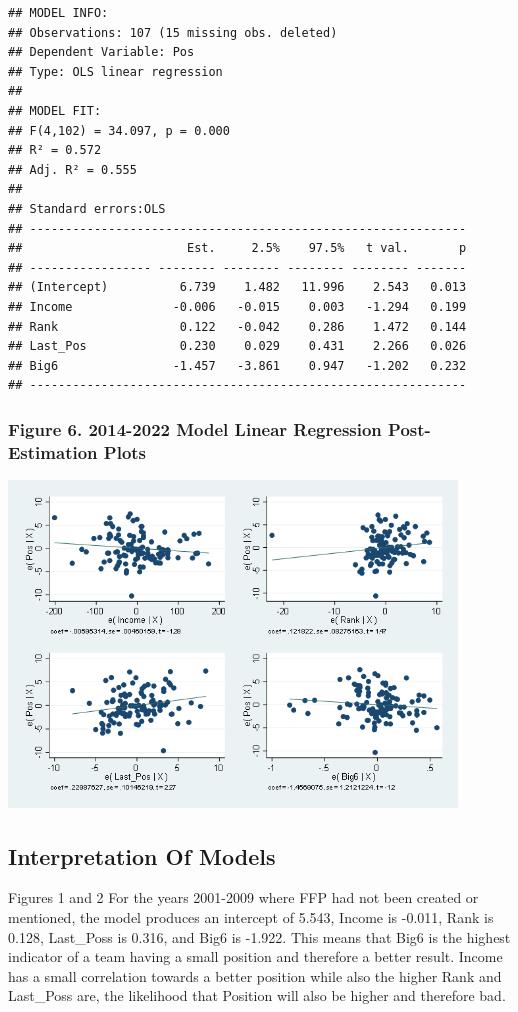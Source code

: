 \documentclass[
  12pt,
]{article}
\begin{document}
\begin{verbatim}
## MODEL INFO:
## Observations: 107 (15 missing obs. deleted)
## Dependent Variable: Pos
## Type: OLS linear regression 
## 
## MODEL FIT:
## F(4,102) = 34.097, p = 0.000
## R² = 0.572
## Adj. R² = 0.555 
## 
## Standard errors:OLS
## -------------------------------------------------------------
##                       Est.     2.5%    97.5%   t val.       p
## ----------------- -------- -------- -------- -------- -------
## (Intercept)          6.739    1.482   11.996    2.543   0.013
## Income              -0.006   -0.015    0.003   -1.294   0.199
## Rank                 0.122   -0.042    0.286    1.472   0.144
## Last_Pos             0.230    0.029    0.431    2.266   0.026
## Big6                -1.457   -3.861    0.947   -1.202   0.232
## -------------------------------------------------------------
\end{verbatim}

\subsubsection{Figure 6. 2014-2022 Model Linear Regression
Post-Estimation
Plots}\label{figure-6.-2014-2022-model-linear-regression-post-estimation-plots}

\includegraphics[width=450px]{2013}

\newpage

\subsection{Interpretation Of Models}\label{interpretation-of-models}

Figures 1 and 2 \textbar{} For the years 2001-2009 where FFP had not
been created or mentioned, the model produces an intercept of 5.543,
Income is -0.011, Rank is 0.128, Last\_Poss is 0.316, and Big6 is
-1.922. This means that Big6 is the highest indicator of a team having a
small position and therefore a better result. Income has a small
correlation towards a better position while also the higher Rank and
Last\_Poss are, the likelihood that Position will also be higher and
therefore bad.
\end{document}
